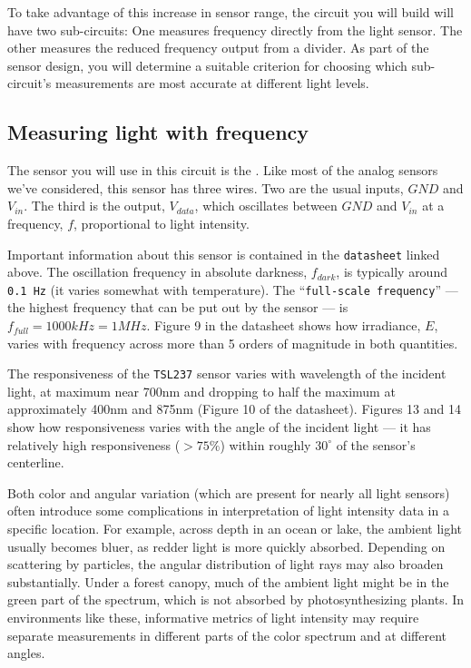 To take advantage of this increase in sensor range, the circuit you will build will have two sub-circuits: One measures frequency directly from the light sensor.
The other measures the reduced frequency output from a divider.
As part of the sensor design, you will determine a suitable criterion for choosing which sub-circuit's measurements are most accurate at different light levels.

\subsection{Measuring light with frequency}
The sensor you will use in this circuit is the .
Like most of the analog sensors we've considered, this sensor has three wires.
Two are the usual inputs, $GND$ and $V_{in}$.
The third is the output, $V_{data}$, which oscillates between $GND$ and $V_{in}$ at a frequency, $f$, proportional to light intensity.

Important information about this sensor is contained in the \texttt{datasheet} linked above.
The oscillation frequency in absolute darkness, $f_{dark}$, is typically around \texttt{0.1 Hz} (it varies somewhat with temperature).
The ``\texttt{full-scale frequency}'' --- the highest frequency that can be put out by the sensor --- is $f_{full}=1000kHz=1MHz$.
Figure 9 in the datasheet shows how irradiance, $E$, varies with frequency across more than 5 orders of magnitude in both quantities.

The responsiveness of the \texttt{TSL237} sensor varies with wavelength of the incident light, at maximum near 700nm and dropping to half the maximum at approximately 400nm and 875nm (Figure 10 of the datasheet).
Figures 13 and 14 show how responsiveness varies with the angle of the incident light --- it has relatively high responsiveness ($>75\%$) within roughly $30^\circ$ of the sensor's centerline.

Both color and angular variation (which are present for nearly all light sensors) often introduce some complications in interpretation of light intensity data in a specific location.
For example, across depth in an ocean or lake, the ambient light usually becomes bluer, as redder light is more quickly absorbed.
Depending on scattering by particles, the angular distribution of light rays may also broaden substantially.
Under a forest canopy, much of the ambient light might be in the green part of the spectrum, which is not absorbed by photosynthesizing plants.
In environments like these, informative metrics of light intensity may require separate measurements in different parts of the color spectrum and at different angles.

